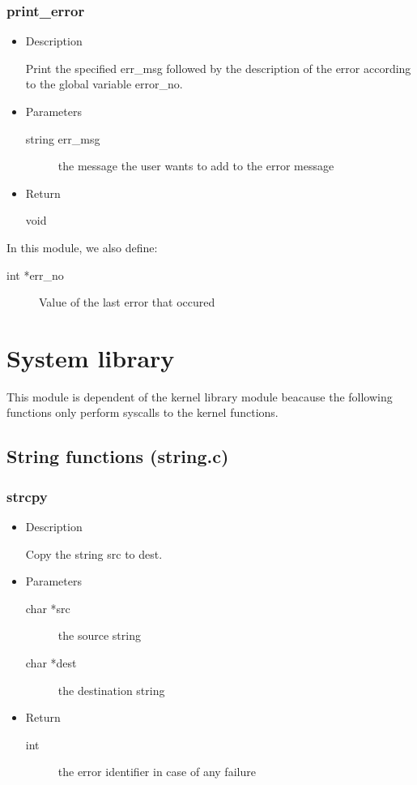 \subsubsection{print\_error}
\begin{itemize}
\item{Description}

	Print the specified err\_msg followed by the description of the
	error according to the global variable error\_no.
\item{Parameters}
	\begin{description}
	\item[string err\_msg] the message the user wants to add to the error message
	\end{description}
\item{Return}
	\begin{description}
	\item[void]
	\end{description}
\end{itemize}

In this module, we also define:
\begin{description}
\item[int *err\_no] Value of the last error that occured
\end{description}

\section{System library}

This module is dependent of the kernel library module beacause the following
functions only perform syscalls to the kernel functions.

\subsection{String functions (string.c)}

\subsubsection{strcpy}
\begin{itemize}
\item{Description}

	Copy the string src to dest.
\item{Parameters}
	\begin{description}
	\item[char *src] the source string
	\item[char *dest] the destination string
	\end{description}
\item{Return}
	\begin{description}
	\item[int] the error identifier in case of any failure
	\end{description}
\end{itemize}

